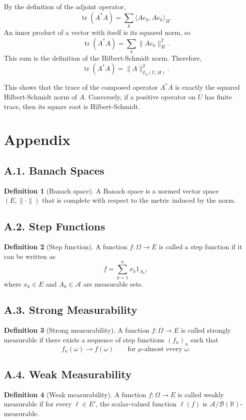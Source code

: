 \documentclass[11pt]{article}
\theoremstyle{definition}
\newtheorem{definition}{Definition}
\theoremstyle{remark}
\begin{document}
By the definition of the adjoint operator,
\[
\operatorname{tr}(A^*A)=\sum_k \langle Ae_k,Ae_k\rangle_H.
\]
An inner product of a vector with itself is its squared norm, so
\[
\operatorname{tr}(A^*A)=\sum_k \|Ae_k\|_H^2.
\]
This sum is the definition of the Hilbert-Schmidt norm. Therefore,
\[
\operatorname{tr}(A^*A)=\|A\|_{L_2(U,H)}^2.
\]

This shows that the trace of the composed operator \(A^*A\) is exactly the squared Hilbert-Schmidt norm of \(A\).
Conversely, if a positive operator on \(U\) has finite trace, then its square root is Hilbert-Schmidt.

\section*{Appendix}
\subsection*{A.1. Banach Spaces}
\begin{definition}[Banach space]
A Banach space is a normed vector space \((E,\|\cdot\|)\) that is complete with respect to the metric induced by the norm.
\end{definition}

\subsection*{A.2. Step Functions}
\begin{definition}[Step function]
A function \(f:\Omega\to E\) is called a step function if it can be written as
\[
f=\sum_{k=1}^{n}x_k1_{A_k},
\]
where \(x_k\in E\) and \(A_k\in\mathcal A\) are measurable sets.
\end{definition}

\subsection*{A.3. Strong Measurability}
\begin{definition}[Strong measurability]
A function \(f:\Omega\to E\) is called strongly measurable if there exists a sequence of step functions \((f_n)_n\) such that
\[
f_n(\omega)\to f(\omega)
\qquad \text{for } \mu\text{-almost every } \omega.
\]
\end{definition}

\subsection*{A.4. Weak Measurability}
\begin{definition}[Weak measurability]
A function \(f:\Omega\to E\) is called weakly measurable if for every \(\ell\in E'\), the scalar-valued function \(\ell(f)\) is \(\mathcal A/\mathcal B(\mathbb R)\)-measurable.
\end{definition}
\end{document}
